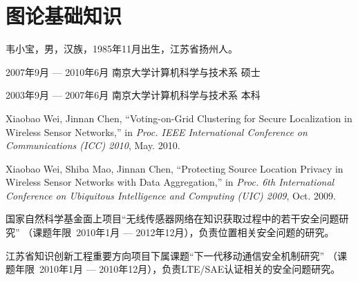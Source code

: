 \documentclass[master]{njuthesis}
\begin{document}
\nocite{*}

%
%

\appendix
\chapter{图论基础知识}


\backmatter
\begin{resume}
\begin{authorinfo}
\noindent 韦小宝，男，汉族，1985年11月出生，江苏省扬州人。
\end{authorinfo}
\begin{education}
\item[2007年9月 --- 2010年6月] 南京大学计算机科学与技术系 \hfill 硕士
\item[2003年9月 --- 2007年6月] 南京大学计算机科学与技术系 \hfill 本科
\end{education}
\begin{publications}
\item Xiaobao Wei, Jinnan Chen, ``Voting-on-Grid Clustering for Secure
  Localization in Wireless Sensor Networks,'' in \textsl{Proc. IEEE International
    Conference on Communications (ICC) 2010}, May. 2010.
\item Xiaobao Wei, Shiba Mao, Jinnan Chen, ``Protecting Source Location Privacy
  in Wireless Sensor Networks with Data Aggregation,'' in \textsl{Proc. 6th
    International Conference on Ubiquitous Intelligence and Computing (UIC)
    2009}, Oct. 2009.
\end{publications}
\begin{projects}
\item 国家自然科学基金面上项目``无线传感器网络在知识获取过程中的若干安全问题研究''
（课题年限~2010年1月 --- 2012年12月），负责位置相关安全问题的研究。
\item 江苏省知识创新工程重要方向项目下属课题``下一代移动通信安全机制研究''
（课题年限~2010年1月 --- 2010年12月），负责LTE/SAE认证相关的安全问题研究。
\end{projects}
\end{resume}

\makelicense

\end{document}

